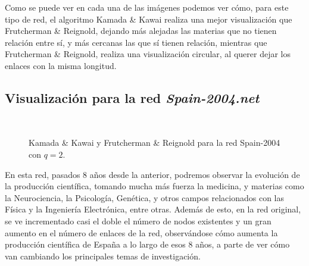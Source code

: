 \documentclass[paper=a4, fontsize=11pt]{article} %
\numberwithin{equation}{section} %
\numberwithin{figure}{section} %
\numberwithin{table}{section} %
\begin{document}
Como se puede ver en cada una de las imágenes podemos ver cómo, para este tipo de red, el algoritmo Kamada \& Kawai realiza una mejor visualización que Frutcherman \& Reignold, dejando más alejadas las materias que no tienen relación entre sí, y más cercanas las que sí tienen relación, mientras que Frutcherman \& Reignold, realiza una visualización circular, al querer dejar los enlaces con la misma longitud.

\subsection{Visualización para la red \textit{Spain-2004.net}}

\begin{figure}[H]
    \centering
    \mbox {
      \qquad
    }
    \caption{Kamada \& Kawai y Frutcherman \& Reignold para la red Spain-2004 con $q=2$.}
    \label{spq204}
\end{figure}

En esta red, pasados 8 años desde la anterior, podremos observar la evolución de la producción científica, tomando mucha más fuerza la medicina, y materias como la Neurociencia, la Psicología, Genética, y otros campos relacionados con las Física y la Ingeniería Electrónica, entre otras. Además de esto, en la red original, se ve incrementado casi el doble el número de nodos existentes y un gran aumento en el número de enlaces de la red, observándose cómo aumenta la producción científica de España a lo largo de esos 8 años, a parte de ver cómo van cambiando los principales temas de investigación.
\end{document}
